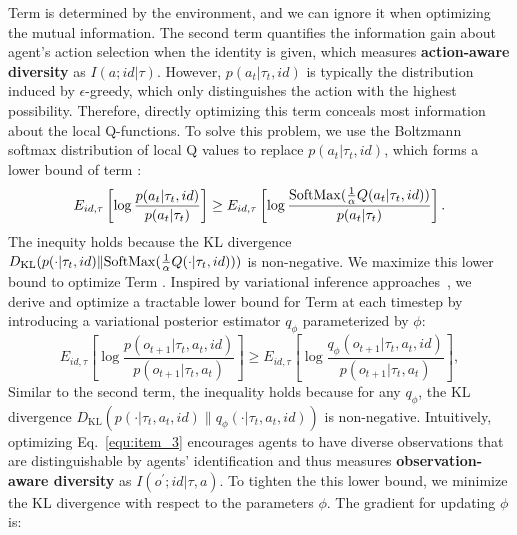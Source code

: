 Term  is determined by the environment, and we can ignore it when optimizing the mutual information. The second term quantifies the information gain about agent's action selection when the identity is given, which measures \textbf{action-aware diversity} as $I(a;id|\tau)$. However, $p(a_t | \tau_t, id)$ is typically the distribution induced by $\epsilon$-greedy, which only distinguishes the action with the highest possibility. Therefore, directly optimizing this term conceals most information about the local Q-functions. To solve this problem, we use the Boltzmann softmax distribution of local Q values to replace $p(a_t | \tau_t, id)$, which forms a lower bound of term :
\begin{equation}
E_{id,\tau}\left[\log \frac{p(a_t | \tau_t, id)}{p(a_t | \tau_t)}\right] \ge E_{id,\tau}\left[\log \frac{{\rm SoftMax}(\frac{1}{\alpha}Q(a_t | \tau_t, id))}{p(a_t | \tau_t)}\right].
\label{equ:item_2}
\end{equation}
The inequity holds because the KL divergence $D_{\mathrm{KL}}(p(\cdot | \tau_t, id) \| {\rm SoftMax}(\frac{1}{\alpha}Q(\cdot | \tau_t, id)))$ is non-negative. We maximize this lower bound to optimize Term . Inspired by variational inference approaches~\cite{wainwright2008graphical}, we derive and optimize a tractable lower bound for Term  at each timestep by introducing a variational posterior estimator $q_\phi$ parameterized by $\phi$:
\begin{equation}
    E_{id,\tau}\left[\log \frac{p(o_{t+1}| \tau_t,a_t,id)}{p(o_{t+1}| \tau_t,a_t)}\right] \ge E_{id,\tau}\left[\log \frac{q_\phi(o_{t+1}| \tau_t,a_t,id)}{p(o_{t+1}| \tau_t,a_t)}\right],
    \label{equ:item_3}
\end{equation}
Similar to the second term, the inequality holds because for any $q_{\phi}$, the KL divergence $D_{\mathrm{KL}}(p(\cdot | \tau_t,a_t,id) \| q_{\phi}(\cdot | \tau_t,a_t,id))$ is non-negative. Intuitively, optimizing Eq.~\ref{equ:item_3} encourages agents to have diverse observations that are distinguishable by agents' identification and thus measures \textbf{observation-aware diversity} as $I(o^{\prime};id|\tau, a)$. To tighten the this lower bound, we minimize the KL divergence with respect to the parameters $\phi$. The gradient for updating $\phi$ is:
